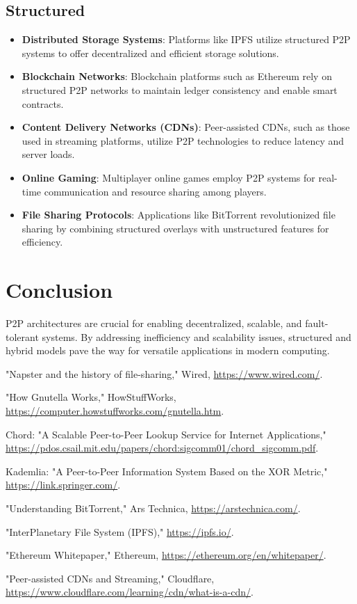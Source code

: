 \documentclass[10pt]{article}
\begin{document}
\subsection{Structured}
\begin{itemize}
    \item \textbf{Distributed Storage Systems}: Platforms like IPFS utilize structured P2P systems to offer decentralized and efficient storage solutions.
    \item \textbf{Blockchain Networks}: Blockchain platforms such as Ethereum rely on structured P2P networks to maintain ledger consistency and enable smart contracts.
    \item \textbf{Content Delivery Networks (CDNs)}: Peer-assisted CDNs, such as those used in streaming platforms, utilize P2P technologies to reduce latency and server loads.
    \item \textbf{Online Gaming}: Multiplayer online games employ P2P systems for real-time communication and resource sharing among players.
    \item \textbf{File Sharing Protocols}: Applications like BitTorrent revolutionized file sharing by combining structured overlays with unstructured features for efficiency.
\end{itemize}

\section{Conclusion}
P2P architectures are crucial for enabling decentralized, scalable, and fault-tolerant systems. By addressing inefficiency and scalability issues, structured and hybrid models pave the way for versatile applications in modern computing.

\begin{thebibliography}{9}

"Napster and the history of file-sharing," Wired, \url{https://www.wired.com/}.

"How Gnutella Works," HowStuffWorks, \url{https://computer.howstuffworks.com/gnutella.htm}.

Chord: "A Scalable Peer-to-Peer Lookup Service for Internet Applications," \url{https://pdos.csail.mit.edu/papers/chord:sigcomm01/chord_sigcomm.pdf}.

Kademlia: "A Peer-to-Peer Information System Based on the XOR Metric," \url{https://link.springer.com/}.

"Understanding BitTorrent," Ars Technica, \url{https://arstechnica.com/}.

"InterPlanetary File System (IPFS)," \url{https://ipfs.io/}.

"Ethereum Whitepaper," Ethereum, \url{https://ethereum.org/en/whitepaper/}.

"Peer-assisted CDNs and Streaming," Cloudflare, \url{https://www.cloudflare.com/learning/cdn/what-is-a-cdn/}.

\end{thebibliography}
\end{document}
